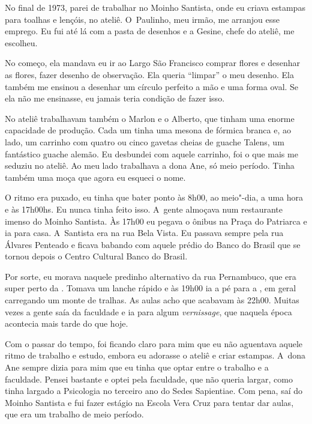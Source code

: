 No final de 1973, parei de trabalhar no Moinho Santista, onde eu criava
estampas para toalhas e lençóis, no ateliê. O~Paulinho, meu irmão, me
arranjou esse emprego. Eu fui até lá com a pasta de desenhos e a Gesine,
chefe do ateliê, me escolheu.

No começo, ela mandava eu ir ao Largo São Francisco comprar flores e
desenhar as flores, fazer desenho de observação. Ela queria ``limpar'' o
meu desenho. Ela também me ensinou a desenhar um círculo perfeito a mão
e uma forma oval. Se ela não me ensinasse, eu jamais teria condição de
fazer isso.

No ateliê trabalhavam também o Marlon e o Alberto, que tinham uma enorme
capacidade de produção. Cada um tinha uma mesona de fórmica branca e, ao
lado, um carrinho com quatro ou cinco gavetas cheias de guache Talens,
um fantástico guache alemão. Eu desbundei com aquele carrinho, foi o que
mais me seduziu no ateliê. Ao meu lado trabalhava a dona Ane, só meio
período. Tinha também uma moça que agora eu esqueci o nome.

O ritmo era puxado, eu tinha que bater ponto às 8h00, ao meio"-dia, a uma
hora e às 17h00hs. Eu nunca tinha feito isso. A~gente almoçava num
restaurante imenso do Moinho Santista. Às 17h00 eu pegava o ônibus na
Praça do Patriarca e ia para casa. A~Santista era na rua Bela Vista. Eu
passava sempre pela rua Álvares Penteado e ficava babando com aquele
prédio do Banco do Brasil que se tornou depois o Centro Cultural Banco
do Brasil.

Por sorte, eu morava naquele predinho alternativo da rua Pernambuco, que
era super perto da . Tomava um lanche rápido e às 19h00 ia a pé para
a , em geral carregando um monte de tralhas. As aulas acho que
acabavam às 22h00. Muitas vezes a gente saía da faculdade e ia para
algum \emph{vernissage}, que naquela época acontecia mais tarde do que
hoje.

Com o passar do tempo, foi ficando claro para mim que eu não aguentava
aquele ritmo de trabalho e estudo, embora eu adorasse o ateliê e criar
estampas. A~dona Ane sempre dizia para mim que eu tinha que optar entre
o trabalho e a faculdade. Pensei bastante e optei pela faculdade, que
não queria largar, como tinha largado a Psicologia no terceiro ano do
Sedes Sapientiae. Com pena, saí do Moinho Santista e fui fazer estágio
na Escola Vera Cruz para tentar dar aulas, que era um trabalho de meio
período.

